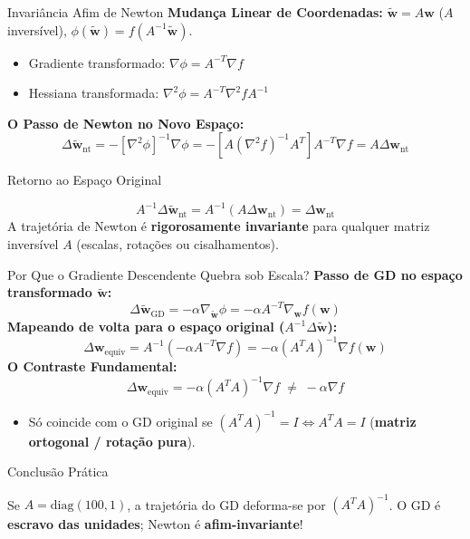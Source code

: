 \documentclass[aspectratio=169, 10pt]{beamer}
\newenvironment{calloutnote}[1][Nota]{%
  \begin{block}{#1}%
}{%
  \end{block}%
}
\newenvironment{calloutwarning}[1][Atenção]{%
  \begin{alertblock}{#1}%
}{%
  \end{alertblock}%
}
\begin{document}
\begin{frame}{Invariância Afim de Newton}
  \textbf{Mudança Linear de Coordenadas:} $\tilde{\mathbf{w}} = A \mathbf{w}$ ($A$ inversível), $\phi(\tilde{\mathbf{w}}) = f(A^{-1}\tilde{\mathbf{w}})$.
  \begin{itemize}
    \item Gradiente transformado: $\nabla \phi = A^{-T} \nabla f$
    \item Hessiana transformada: $\nabla^2 \phi = A^{-T} \nabla^2 f A^{-1}$
  \end{itemize}
  \vspace{0.2cm}
  \textbf{O Passo de Newton no Novo Espaço:}
  \[\Delta\tilde{\mathbf{w}}_{\text{nt}} = -[\nabla^2 \phi]^{-1} \nabla \phi = -[A (\nabla^2 f)^{-1} A^T] A^{-T} \nabla f = A \Delta\mathbf{w}_{\text{nt}}\]
  \vspace{0.2cm}
  \begin{calloutnote}[Retorno ao Espaço Original]
    \[A^{-1}\Delta\tilde{\mathbf{w}}_{\text{nt}} = A^{-1}(A \Delta\mathbf{w}_{\text{nt}}) = \Delta\mathbf{w}_{\text{nt}}\]
    A trajetória de Newton é \textbf{rigorosamente invariante} para qualquer matriz inversível $A$ (escalas, rotações ou cisalhamentos).
  \end{calloutnote}
\end{frame}

\begin{frame}{Por Que o Gradiente Descendente Quebra sob Escala?}
  \textbf{Passo de GD no espaço transformado $\tilde{\mathbf{w}}$:}
  \[\Delta\tilde{\mathbf{w}}_{\text{GD}} = -\alpha \nabla_{\tilde{\mathbf{w}}} \phi = -\alpha A^{-T} \nabla_{\mathbf{w}} f(\mathbf{w})\]
  \vspace{0.2cm}
  \textbf{Mapeando de volta para o espaço original ($A^{-1}\Delta\tilde{\mathbf{w}}$):}
  \[\Delta\mathbf{w}_{\text{equiv}} = A^{-1}(-\alpha A^{-T} \nabla f) = -\alpha (A^T A)^{-1} \nabla f(\mathbf{w})\]
  \vspace{0.2cm}
  \textbf{O Contraste Fundamental:}
  \[\Delta\mathbf{w}_{\text{equiv}} = -\alpha (A^T A)^{-1} \nabla f \;\neq\; -\alpha \nabla f\]
  \begin{itemize}
    \item Só coincide com o GD original se $(A^T A)^{-1} = I \iff A^T A = I$ (\textbf{matriz ortogonal / rotação pura}).
  \end{itemize}
  \vspace{0.2cm}
  \begin{calloutwarning}[Conclusão Prática]
    Se $A = \text{diag}(100, 1)$, a trajetória do GD deforma-se por $(A^T A)^{-1}$. O GD é \textbf{escravo das unidades}; Newton é \textbf{afim-invariante}!
  \end{calloutwarning}
\end{frame}
\end{document}
